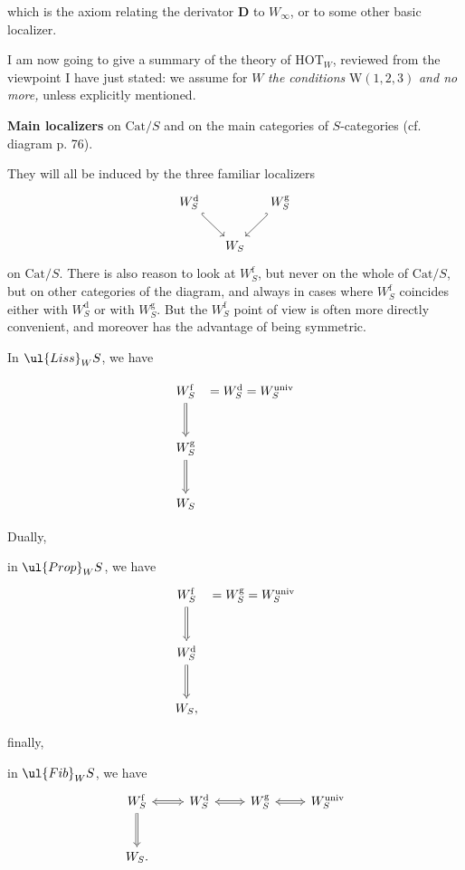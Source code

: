 
which is the axiom relating the derivator $\mathbf{D}$ to $W_\infty$, or to some other basic localizer.

I am now going to give a summary of the theory of $\mathrm{HOT}_W$, reviewed from the viewpoint I have just stated: we assume for $W$ \textit{the conditions} $\mathrm{W}(1,2,3)$ \textit{and no more,} unless explicitly mentioned.

 \textbf{Main localizers} on $\mathrm{Cat}/S$ and on the main categories of $S$-categories (cf. diagram p. 76).

They will all be induced by the three familiar localizers
\[
\begin{tikzcd}[column sep=small]
W_S^{\mathrm{d}} \arrow[dr, hook] & & W_S^{\mathrm{g}} \arrow[dl, hook'] \\
& W_S &
\end{tikzcd}
\]
on $\mathrm{Cat}/S$. There is also reason to look at $W_S^{\mathrm{f}}$, but never on the whole of $\mathrm{Cat}/S$, but on other categories of the diagram, and always in cases where $W_S^{\mathrm{f}}$ coincides either with $W_S^{\mathrm{d}}$ or with $W_S^{\mathrm{g}}$. But the $W_S^{\mathrm{f}}$ point of view is often more directly convenient, and moreover has the advantage of being symmetric.

 In $\ul{Liss}_W S$, we have


\[
\begin{tikzcd}[row sep=large, column sep=0pt]
W_S^{\mathrm{f}} \arrow[d, Rightarrow] & {} = W_S^{\mathrm{d}} = W_S^{\mathrm{univ}} \\
W_S^{\mathrm{g}} \arrow[d, Rightarrow] & \\
W_S &
\end{tikzcd}
\]

Dually,

 in $\ul{Prop}_W S$, we have
\[
\begin{tikzcd}[row sep=large, column sep=0pt]
W_S^{\mathrm{f}} \arrow[d, Rightarrow] & {} = W_S^{\mathrm{g}} = W_S^{\mathrm{univ}} \\
W_S^{\mathrm{d}} \arrow[d, Rightarrow] & \\
W_S, &
\end{tikzcd}
\]


finally,

 in $\ul{Fib}_W S$, we have
\[
\begin{tikzcd}[row sep=large]
W_S^{\mathrm{f}} \arrow[r, Leftrightarrow] \arrow[d, Rightarrow] & W_S^{\mathrm{d}} \arrow[r, Leftrightarrow] & W_S^{\mathrm{g}} \arrow[r, Leftrightarrow] & W_S^{\mathrm{univ}} \\
W_S. & & &
\end{tikzcd}
\]

